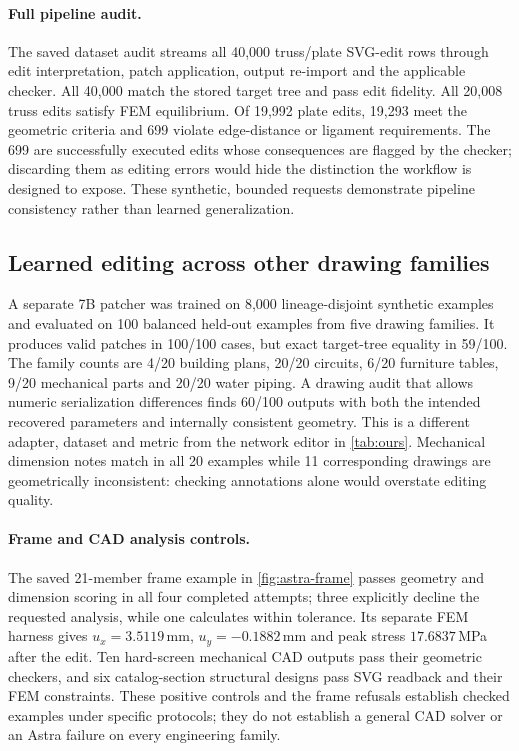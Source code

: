 \paragraph{Full pipeline audit.} The saved dataset audit streams all 40,000 truss/plate SVG-edit rows
through edit interpretation, patch application, output re-import and the applicable checker. All 40,000
match the stored target tree and pass edit fidelity. All 20,008 truss edits satisfy FEM equilibrium.
Of 19,992 plate edits, 19,293 meet the geometric criteria and 699 violate edge-distance or ligament
requirements. The 699 are successfully executed edits whose consequences are flagged by the checker;
discarding them as editing errors would hide the distinction the workflow is designed to expose.
These synthetic, bounded requests demonstrate pipeline consistency rather than learned generalization.

\subsection{Learned editing across other drawing families}
A separate 7B patcher was trained on 8,000 lineage-disjoint synthetic examples and evaluated on 100
balanced held-out examples from five drawing families. It produces valid patches in 100/100 cases,
but exact target-tree equality in 59/100. The family counts are 4/20 building plans, 20/20 circuits,
6/20 furniture tables, 9/20 mechanical parts and 20/20 water piping. A drawing audit that allows
numeric serialization differences finds 60/100 outputs with both the intended recovered parameters
and internally consistent geometry. This is a different adapter, dataset and metric from the network
editor in \cref{tab:ours}. Mechanical dimension notes match in all 20 examples while 11 corresponding
drawings are geometrically inconsistent: checking annotations alone would overstate editing quality.

\paragraph{Frame and CAD analysis controls.} The saved 21-member frame example in
\cref{fig:astra-frame} passes geometry and dimension scoring in all four completed attempts; three
explicitly decline the requested analysis, while one calculates within tolerance. Its separate FEM
harness gives $u_x=3.5119$\,mm, $u_y=-0.1882$\,mm and peak stress $17.6837$\,MPa after the edit.
Ten hard-screen mechanical CAD outputs pass their geometric checkers, and six catalog-section
structural designs pass SVG readback and their FEM constraints. These positive controls and the frame
refusals establish checked examples under specific protocols; they do not establish a general CAD
solver or an Astra failure on every engineering family.

